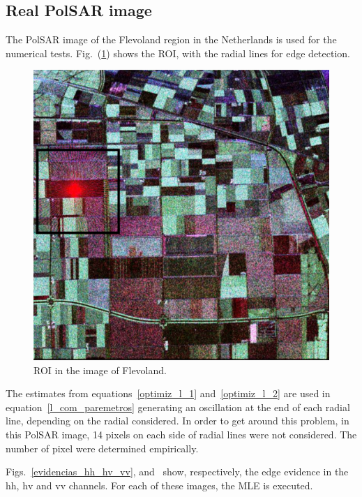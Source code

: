 \documentclass[journal]{IEEEtran}
\begin{document}
\subsection{Real PolSAR image}
The PolSAR image of the Flevoland region in the Netherlands is used for the numerical tests. 
Fig.~(\ref{flevoland_radial_4look}) shows the ROI, with the radial lines for edge detection.

\begin{figure}[hbt]
\centering
	\includegraphics[width=\linewidth]{flevoland_radial_4_look_black}
	\caption{ROI in the image of Flevoland.}
\label{flevoland_radial_4look}
\end{figure}

The estimates from equations~\eqref{optimiz_l_1} and~\eqref{optimiz_l_2} are used in equation~\eqref{l_com_paremetros} generating an oscillation at the end of each radial line, depending on the radial considered. In order to get around this problem, in this PolSAR image, 14 pixels on each side of radial lines were not considered. The number of pixel were determined empirically.

Figs.~\ref{evidencias_hh_hv_vv},  and~ show, respectively, the edge evidence in the $\text{hh}$, $\text{hv}$ and $\text{vv}$ channels. For each of these images, the MLE is executed.
\end{document}
